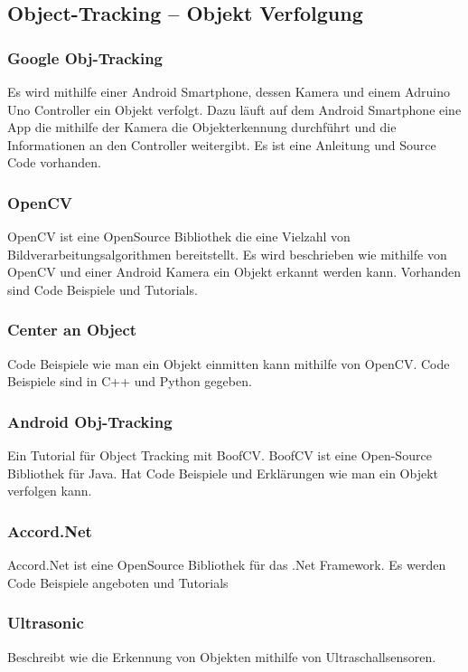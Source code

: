\subsection{Object-Tracking – Objekt Verfolgung}
\subsubsection{Google Obj-Tracking}
Es wird mithilfe einer Android Smartphone, dessen Kamera und einem Adruino Uno Controller ein Objekt verfolgt. Dazu läuft auf dem Android Smartphone eine App die mithilfe der Kamera die Objekterkennung durchführt und die Informationen an den Controller weitergibt. Es ist eine Anleitung und Source Code vorhanden.

\subsubsection{OpenCV}
OpenCV ist eine OpenSource Bibliothek die eine Vielzahl von Bildverarbeitungsalgorithmen bereitstellt. Es wird beschrieben wie mithilfe von OpenCV und einer Android Kamera ein Objekt erkannt werden kann. Vorhanden sind Code Beispiele und Tutorials.

\subsubsection{Center an Object}
Code Beispiele wie man ein Objekt einmitten kann mithilfe von OpenCV. Code Beispiele sind in C++ und Python gegeben.

\subsubsection{Android Obj-Tracking}
Ein Tutorial für Object Tracking mit BoofCV. BoofCV ist eine Open-Source Bibliothek für Java. Hat Code Beispiele und Erklärungen wie man ein Objekt verfolgen kann.

\subsubsection{Accord.Net}
Accord.Net ist eine OpenSource Bibliothek für das .Net Framework. Es werden Code Beispiele angeboten und Tutorials
	
\subsubsection{Ultrasonic}
Beschreibt wie die Erkennung von Objekten mithilfe von Ultraschallsensoren.

